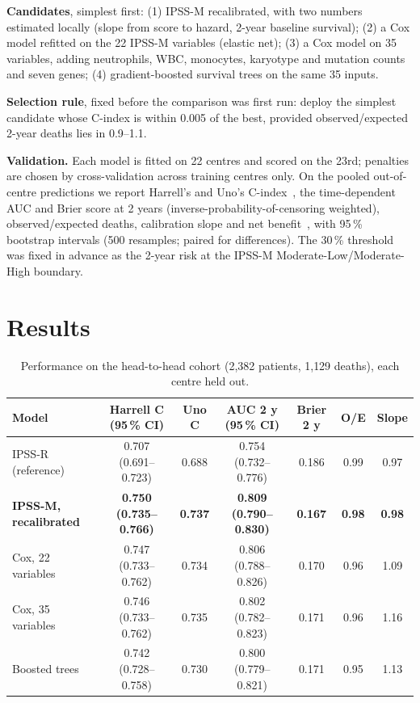 \documentclass[11pt,a4paper]{article}
\begin{document}
\textbf{Candidates}, simplest first: (1) IPSS-M recalibrated, with two numbers estimated locally (slope from score to hazard, 2-year baseline survival); (2) a Cox model refitted on the 22 IPSS-M variables (elastic net); (3) a Cox model on 35 variables, adding neutrophils, WBC, monocytes, karyotype and mutation counts and seven genes; (4) gradient-boosted survival trees on the same 35 inputs.

\textbf{Selection rule}, fixed before the comparison was first run: deploy the simplest candidate whose C-index is within 0.005 of the best, provided observed/expected 2-year deaths lies in 0.9--1.1.

\textbf{Validation.} Each model is fitted on 22 centres and scored on the 23rd; penalties are chosen by cross-validation across training centres only. On the pooled out-of-centre predictions we report Harrell's and Uno's C-index~\cite{uno}, the time-dependent AUC and Brier score at 2 years (inverse-probability-of-censoring weighted), observed/expected deaths, calibration slope and net benefit~\cite{vickers}, with 95\,\% bootstrap intervals (500 resamples; paired for differences). The 30\,\% threshold was fixed in advance as the 2-year risk at the IPSS-M Moderate-Low/Moderate-High boundary.

\section{Results}
\begin{table}[h]
\centering\small
\setlength{\tabcolsep}{4pt}
\caption{Performance on the head-to-head cohort (2{,}382 patients, 1{,}129 deaths), each centre held out.}\label{tab:metrics}
\begin{tabular}{@{}lcccccc@{}}
\toprule
Model & Harrell C (95\,\% CI) & Uno C & AUC 2 y (95\,\% CI) & Brier 2 y & O/E & Slope\\
\midrule
IPSS-R (reference) & 0.707 (0.691--0.723) & 0.688 & 0.754 (0.732--0.776) & 0.186 & 0.99 & 0.97\\
\textbf{IPSS-M, recalibrated} & \textbf{0.750 (0.735--0.766)} & \textbf{0.737} & \textbf{0.809 (0.790--0.830)} & \textbf{0.167} & \textbf{0.98} & \textbf{0.98}\\
Cox, 22 variables & 0.747 (0.733--0.762) & 0.734 & 0.806 (0.788--0.826) & 0.170 & 0.96 & 1.09\\
Cox, 35 variables & 0.746 (0.733--0.762) & 0.735 & 0.802 (0.782--0.823) & 0.171 & 0.96 & 1.16\\
Boosted trees & 0.742 (0.728--0.758) & 0.730 & 0.800 (0.779--0.821) & 0.171 & 0.95 & 1.13\\
\bottomrule
\end{tabular}
\end{table}
\end{document}
